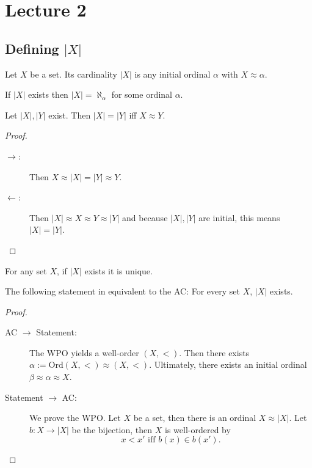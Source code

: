 \documentclass{whrartcl}
\newcommand{\ord}{\text{Ord}}
\newcommand{\abs}[1]{|#1|}
\begin{document}
\section{Lecture 2}

\subsection{Defining $\abs{X}$}

\begin{definition}
  Let $X$ be a set. Its cardinality $\abs{X}$ is any initial ordinal $\alpha$
  with $X \approx \alpha$.
\end{definition}

\begin{remark}
  If $\abs{X}$ exists then $\abs{X} = \aleph_\alpha$ for some ordinal $\alpha$.
\end{remark}

\begin{lemma}
  Let $\abs{X}, \abs{Y}$ exist. Then $\abs{X} = \abs{Y}$ iff $X \approx Y$.
\end{lemma}
\begin{proof}
  \
  \begin{description}
  \item[$\to$:] Then $X \approx \abs{X} = \abs{Y} \approx Y$.
  \item[$\leftarrow$:] Then $\abs{X} \approx X \approx Y \approx \abs{Y}$ and
    because $\abs{X}, \abs{Y}$ are initial, this means $\abs{X} = \abs{Y}$.
  \end{description}
\end{proof}

\begin{corollary}
  For any set $X$, if $\abs{X}$ exists it is unique.
\end{corollary}

\begin{theorem}
  The following statement in equivalent to the AC: For every set $X$, $\abs{X}$ exists.
\end{theorem}
\begin{proof}
  \
  \begin{description}
  \item[AC $\to$ Statement:] The WPO yields a well-order $(X, <)$. Then
    there exists $\alpha := \ord(X, <) \approx (X, <)$. Ultimately, there
    exists an initial ordinal $\beta \approx \alpha \approx X$.
  \item[Statement $\to$ AC:] We prove the WPO. Let $X$ be a set, then there is
    an ordinal $X \approx \abs{X}$. Let $b : X \to \abs{X}$ be the bijection,
    then $X$ is well-ordered by
    \[
      x < x' \text{ iff } b(x) \in b(x').
    \]
  \end{description}
\end{proof}
\end{document}
